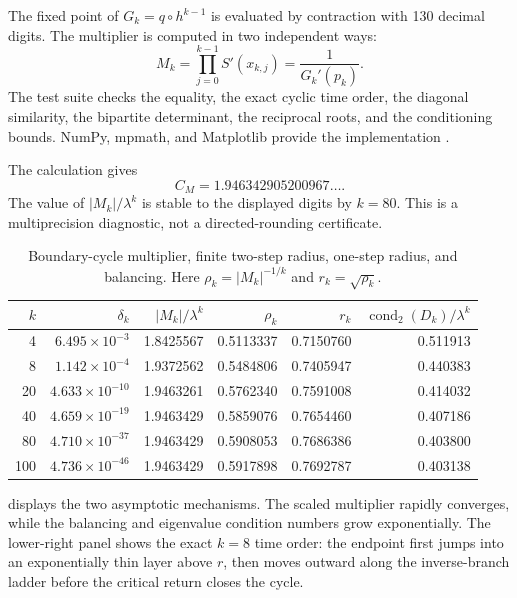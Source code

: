 \documentclass[11pt]{article}
\theoremstyle{definition}
\theoremstyle{remark}
\newcommand{\cond}{\operatorname{cond}_2}
\begin{document}
The fixed point of $G_k=q\circ h^{k-1}$ is evaluated by contraction with 130
decimal digits.  The multiplier is computed in two independent ways:
\begin{equation}\label{eq:numerical-multiplier-check}
 M_k=\prod_{j=0}^{k-1}S'(x_{k,j})
 =\frac1{G_k'(p_k)}.
\end{equation}
The test suite checks the equality, the exact cyclic time order, the diagonal
similarity, the bipartite determinant, the reciprocal roots, and the
conditioning bounds.  NumPy, mpmath, and Matplotlib provide the implementation
\citep{HarrisEtAl2020,Mpmath2026,Hunter2007}.

The calculation gives
\begin{equation}\label{eq:CM-numerical}
 C_M=1.946342905200967\ldots.
\end{equation}
The value of $|M_k|/\lambda^k$ is stable to the displayed digits by
$k=80$.  This is a multiprecision diagnostic, not a directed-rounding
certificate.

\begin{table}[H]
\centering
\small
\caption{Boundary-cycle multiplier, finite two-step radius, one-step radius,
and balancing.  Here $\rho_k=|M_k|^{-1/k}$ and
$r_k=\sqrt{\rho_k}$.}
\label{tab:multiplier}
\begin{tabular}{rrrrrr}
\toprule
$k$ & $\delta_k$ & $|M_k|/\lambda^k$ & $\rho_k$ & $r_k$
& $\cond(D_k)/\lambda^k$\\
\midrule
4  & $6.495\times10^{-3}$  & 1.8425567 & 0.5113337 & 0.7150760 & 0.511913\\
8  & $1.142\times10^{-4}$  & 1.9372562 & 0.5484806 & 0.7405947 & 0.440383\\
20 & $4.633\times10^{-10}$ & 1.9463261 & 0.5762340 & 0.7591008 & 0.414032\\
40 & $4.659\times10^{-19}$ & 1.9463429 & 0.5859076 & 0.7654460 & 0.407186\\
80 & $4.710\times10^{-37}$ & 1.9463429 & 0.5908053 & 0.7686386 & 0.403800\\
100& $4.736\times10^{-46}$ & 1.9463429 & 0.5917898 & 0.7692787 & 0.403138\\
\bottomrule
\end{tabular}
\end{table}

 displays the two asymptotic mechanisms.  The scaled
multiplier rapidly converges, while the balancing and eigenvalue condition
numbers grow exponentially.  The lower-right panel shows the exact $k=8$
time order: the endpoint first jumps into an exponentially thin layer above
$r$, then moves outward along the inverse-branch ladder before the critical
return closes the cycle.
\end{document}
